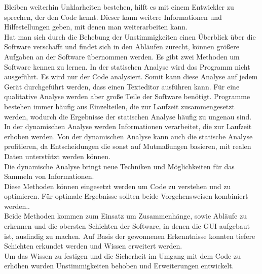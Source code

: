 \documentclass[12pt,a4paper]{article}
\begin{document}
 Bleiben weiterhin Unklarheiten bestehen, hilft es mit einem Entwickler zu sprechen, der den Code kennt. Dieser kann weitere Informationen und Hilfestellungen geben, mit denen man weiterarbeiten kann.\\
Hat man sich durch die Behebung der Unstimmigkeiten einen Überblick über die Software verschafft und findet sich in den Abläufen zurecht, können größere Aufgaben an der Software übernommen werden. 
Es gibt zwei Methoden um Software kennen zu lernen. In der statischen Analyse wird das Programm nicht ausgeführt. Es wird nur der Code analysiert\cite{mock2003dynamic}. Somit kann diese Analyse auf jedem Gerät durchgeführt werden, dass einen Texteditor ausführen kann. Für eine qualitative Analyse werden aber große Teile der Software benötigt. Programme bestehen immer häufig aus Einzelteilen, die zur Laufzeit zusammengesetzt werden, wodurch die Ergebnisse der statischen Analyse häufig zu ungenau sind\cite{mock2003dynamic}.\\
In der dynamischen Analyse werden Informationen verarbeitet, die zur Laufzeit erhoben werden. Von der dynamischen Analyse kann auch die statische Analyse profitieren, da Entscheidungen die sonst auf Mutmaßungen basieren, mit realen Daten unterstützt werden können\cite{mock2003dynamic}.\\
Die dynamische Analyse bringt neue Techniken und Möglichkeiten für das Sammeln von Informationen\cite{mock2003dynamic}.\\
Diese Methoden können eingesetzt werden um Code zu verstehen und zu optimieren. Für optimale Ergebnisse sollten beide Vorgehensweisen kombiniert werden.\cite{mock2003dynamic}.\\
Beide Methoden kommen zum Einsatz um Zusammenhänge, sowie Abläufe zu erkennen und die obersten Schichten der Software, in denen die \ac{GUI} aufgebaut ist, ausfindig zu machen. Auf Basis der gewonnenen Erkenntnisse konnten tiefere Schichten erkundet werden und Wissen erweitert werden.\\
Um das Wissen zu festigen und die Sicherheit im Umgang mit dem Code zu erhöhen wurden Unstimmigkeiten behoben und Erweiterungen entwickelt. \\


\newpage


\end{document}
